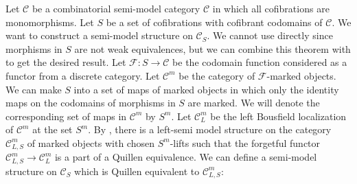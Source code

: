 \documentclass[reqno]{amsart}
\theoremstyle{definition}
\theoremstyle{remark}
\newcommand{\cat}[1]{\mathcal{#1}}
\newcommand{\C}{\cat{C}}
\numberwithin{figure}{section}
\begin{document}
Let $\C$ be a combinatorial semi-model category $\C$ in which all cofibrations are monomorphisms.
Let $S$ be a set of cofibrations with cofibrant codomains of $\C$.
We want to construct a semi-model structure on $\C_S$.
We cannot use  directly since morphisms in $S$ are not weak equivalences, but we can combine this theorem with  to get the desired result.
Let $\mathcal{F} : S \to \C$ be the codomain function considered as a functor from a discrete category.
Let $\C^m$ be the category of $\mathcal{F}$-marked objects.
We can make $S$ into a set of maps of marked objects in which only the identity maps on the codomains of morphisms in $S$ are marked.
We will denote the corresponding set of maps in $\C^m$ by $S^m$.
Let $\C^m_L$ be the left Bousfield localization of $\C^m$ at the set $S^m$.
By , there is a left-semi model structure on the category $\C^m_{L,S}$ of marked objects with chosen $S^m$-lifts such that the forgetful functor $\C^m_{L,S} \to \C^m_L$ is a part of a Quillen equivalence.
We can define a semi-model structure on $\C_S$ which is Quillen equivalent to $\C^m_{L,S}$:
\end{document}
